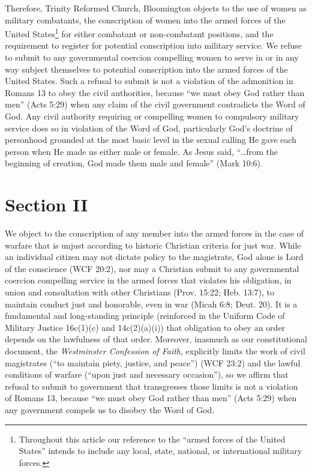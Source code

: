 \documentclass[
]{book}
\begin{document}
Therefore, Trinity Reformed Church, Bloomington objects to the use of women as military combatants, the conscription of women into the armed forces of the United States\footnote{Throughout this article our reference to the ``armed forces of the United States'' intends to include any local, state, national, or international military forces.} for either combatant or non-combatant positions, and the requirement to register for potential conscription into military service. We refuse to submit to any governmental coercion compelling women to serve in or in any way subject themselves to potential conscription into the armed forces of the United States. Such a refusal to submit is not a violation of the admonition in Romans 13 to obey the civil authorities, because ``we must obey God rather than men'' (Acts 5:29) when any claim of the civil government contradicts the Word of God. Any civil authority requiring or compelling women to compulsory military service does so in violation of the Word of God, particularly God's doctrine of personhood grounded at the most basic level in the sexual calling He gave each person when He made us either male or female. As Jesus said, ``\ldots from the beginning of creation, God made them male and female'' (Mark 10:6).

\hypertarget{section-ii}{%
\section*{Section II}\label{section-ii}}

We object to the conscription of any member into the armed forces in the case of warfare that is unjust according to historic Christian criteria for just war. While an individual citizen may not dictate policy to the magistrate, God alone is Lord of the conscience (WCF 20:2), nor may a Christian submit to any governmental coercion compelling service in the armed forces that violates his obligation, in union and consultation with other Christians (Prov. 15:22; Heb. 13:7), to maintain conduct just and honorable, even in war (Micah 6:8; Deut. 20). It is a fundamental and long-standing principle (reinforced in the Uniform Code of Military Justice 16c(1)(c) and 14c(2)(a)(i)) that obligation to obey an order depends on the lawfulness of that order. Moreover, inasmuch as our constitutional document, the \emph{Westminster Confession of Faith}, explicitly limits the work of civil magistrates (``to maintain piety, justice, and peace'') (WCF 23:2) and the lawful conditions of warfare (``upon just and necessary occasion''), so we affirm that refusal to submit to government that transgresses those limits is not a violation of Romans 13, because ``we must obey God rather than men'' (Acts 5:29) when any government compels us to disobey the Word of God.
\end{document}

